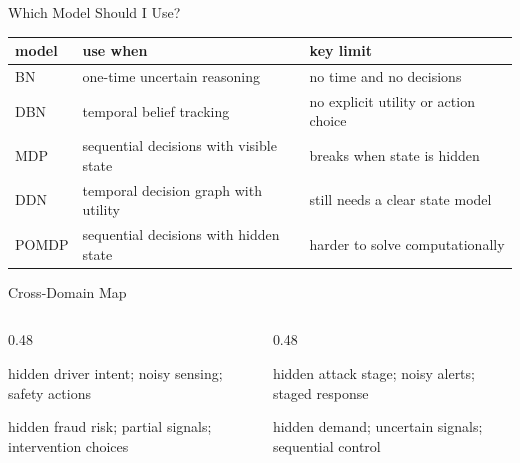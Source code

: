 \documentclass[aspectratio=169]{beamer}
\begin{document}
\begin{frame}{Which Model Should I Use?}
\small
\begin{center}
\begin{tabular}{>{\raggedright\arraybackslash}p{} >{\raggedright\arraybackslash}p{} >{\raggedright\arraybackslash}p{}}
\toprule
model & use when & key limit \\
\midrule
BN & one-time uncertain reasoning & no time and no decisions \\
DBN & temporal belief tracking & no explicit utility or action choice \\
MDP & sequential decisions with visible state & breaks when state is hidden \\
DDN & temporal decision graph with utility & still needs a clear state model \\
POMDP & sequential decisions with hidden state & harder to solve computationally \\
\bottomrule
\end{tabular}
\end{center}
\end{frame}

\begin{frame}{Cross-Domain Map}
\begin{columns}[T,onlytextwidth]
  \begin{column}{0.48\textwidth}
    \begin{tcolorbox}[colback=plainbg,colframe=plainframe,boxrule=0.7pt,title=Autonomous driving]
    \small hidden driver intent; noisy sensing; safety actions
    \end{tcolorbox}
    \begin{tcolorbox}[colback=questionbg,colframe=questionframe,boxrule=0.7pt,title=Financial risk]
    \small hidden fraud risk; partial signals; intervention choices
    \end{tcolorbox}
  \end{column}
  \begin{column}{0.48\textwidth}
    \begin{tcolorbox}[colback=notationbg,colframe=notationframe,boxrule=0.7pt,title=Cybersecurity]
    \small hidden attack stage; noisy alerts; staged response
    \end{tcolorbox}
    \begin{tcolorbox}[colback=plainbg,colframe=plainframe,boxrule=0.7pt,title=Transport and energy]
    \small hidden demand; uncertain signals; sequential control
    \end{tcolorbox}
  \end{column}
\end{columns}
\end{frame}
\end{document}
